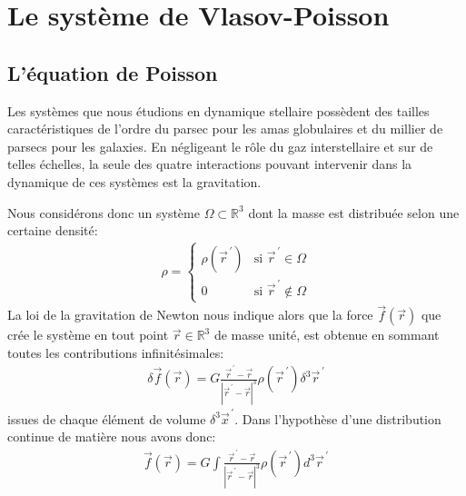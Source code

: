 
\section{Le système de Vlasov-Poisson}

\subsection{L'équation de Poisson}



Les systèmes que nous étudions en dynamique stellaire possèdent des tailles caractéristiques de l'ordre du parsec pour les amas globulaires et du
millier de parsecs pour les galaxies. En négligeant le rôle du gaz interstellaire et sur de telles échelles, la seule des quatre interactions pouvant
intervenir dans la dynamique de ces systèmes est la gravitation.

Nous considérons donc un système $\Omega\subset\mathbb{R}^{3}$ dont la masse est distribuée selon une certaine densité:
\begin{align*}
	\rho = \begin{cases}
		\rho(\vec{r}^{\,\prime}) & \text{si } \vec{r}^{\,\prime}\in\Omega\\
		0 & \text{si } \vec{r}^{\,\prime}\notin\Omega
	\end{cases}
\end{align*}
La loi de la gravitation de Newton nous indique alors que la force $\vec{f}(\vec{r})$ que crée le système en tout point
$\vec{r}\in\mathbb{R}^{3}$ de masse unité, est obtenue en sommant toutes les contributions infinitésimales:
\begin{align}
	\delta\vec{f}(\vec{r})=G\frac{\vec{r}^{\,\prime}-\vec{r}}{\left\vert\vec{r}^{\,\prime}-\vec{r}\right\vert ^{3}}\rho(\vec{r}^{\,\prime}%
	)\delta^{3}\vec{r}^{\,\prime}\label{poisss}%
\end{align}
issues de chaque élément de volume $\delta^{3}\vec{x}^{\,\prime}$. Dans l'hypothèse d'une distribution continue de matière nous avons donc:
\begin{align}
	\vec{f}(\vec{r})=G\displaystyle\int\frac{\vec{r}^{\,\prime}-\vec{r}}{\left\vert \vec{r}^{\,\prime}-\vec{r}\right\vert ^{3}}\rho
	(\vec{r}^{\,\prime})d^{3}\vec{r}^{\,\prime}\label{eq1}%
\end{align}

